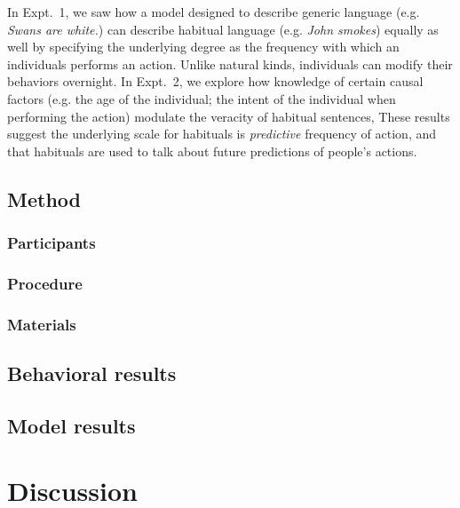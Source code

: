 \documentclass[10pt,letterpaper]{article}
\begin{document}
In Expt.~1, we saw how a model designed to describe generic language (e.g. \emph{Swans are white.}) can describe habitual language (e.g. \emph{John smokes}) equally as well by specifying the underlying degree as the frequency with which an individuals performs an action.
Unlike natural kinds, individuals can modify their behaviors overnight.  
In Expt.~2, we explore how knowledge of certain causal factors (e.g. the age of the individual; the intent of the individual when performing the action) modulate the veracity of habitual sentences, 
These results suggest the underlying scale for habituals is \emph{predictive} frequency of action, and that habituals are used to talk about future predictions of people's actions.

\subsection{Method}


\subsubsection{Participants}
\subsubsection{Procedure}
\subsubsection{Materials}

\subsection{Behavioral results}

\subsection{Model results}



\section{Discussion}



\setlength{\bibleftmargin}{.125in}
\setlength{\bibindent}{-\bibleftmargin}


\end{document}
